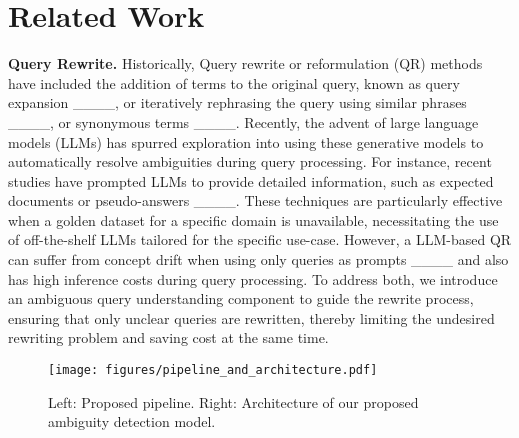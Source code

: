 \section{Related Work}
\textbf{Query Rewrite.} 
Historically, Query rewrite or reformulation (QR) methods have included the addition of terms to the original query, known as query expansion ____, or iteratively rephrasing the query using similar phrases ____, or synonymous terms ____. 
Recently, the advent of large language models (LLMs) has spurred exploration into using these generative models to automatically resolve ambiguities during query processing.
For instance, recent studies have prompted LLMs to provide detailed information, such as expected documents or pseudo-answers ____. These techniques are particularly effective when a golden dataset for a specific domain is unavailable, necessitating the use of off-the-shelf LLMs tailored for the specific use-case.
However, a
LLM-based QR can suffer from concept drift when using only queries as prompts ____ and also has high inference costs during query processing. 
To address both, we introduce an ambiguous query understanding component to guide the rewrite process, ensuring that only unclear queries are rewritten, thereby limiting the undesired rewriting problem and saving cost at the same time. 

\begin{figure*}[htbp]
    \centering
    \texttt{[image: figures/pipeline\_and\_architecture.pdf]} %
    \caption{Left: Proposed pipeline. Right: Architecture of our proposed ambiguity detection model.}
    \label{fig:pipline_and_architecture}
    \vspace{-0.5cm}
\end{figure*}

